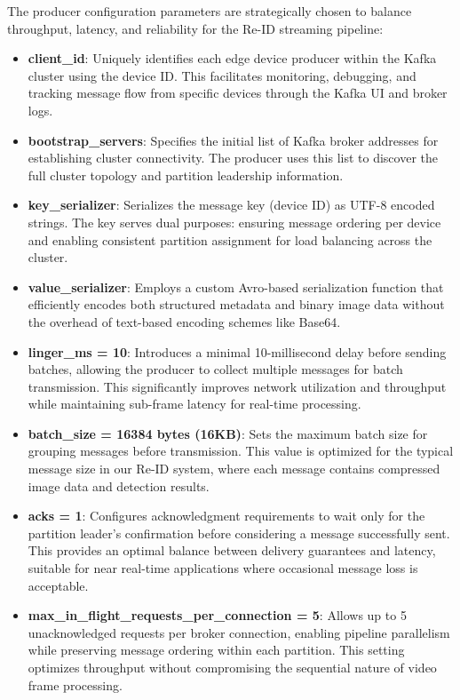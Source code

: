 The producer configuration parameters are strategically chosen to balance throughput, latency, and reliability for the Re-ID streaming pipeline:

\begin{itemize}
    \item \textbf{client\_id}: Uniquely identifies each edge device producer within the Kafka cluster using the device ID. This facilitates monitoring, debugging, and tracking message flow from specific devices through the Kafka UI and broker logs.
    
    \item \textbf{bootstrap\_servers}: Specifies the initial list of Kafka broker addresses for establishing cluster connectivity. The producer uses this list to discover the full cluster topology and partition leadership information.
    
    \item \textbf{key\_serializer}: Serializes the message key (device ID) as UTF-8 encoded strings. The key serves dual purposes: ensuring message ordering per device and enabling consistent partition assignment for load balancing across the cluster.
    
    \item \textbf{value\_serializer}: Employs a custom Avro-based serialization function that efficiently encodes both structured metadata and binary image data without the overhead of text-based encoding schemes like Base64.
    
    \item \textbf{linger\_ms = 10}: Introduces a minimal 10-millisecond delay before sending batches, allowing the producer to collect multiple messages for batch transmission. This significantly improves network utilization and throughput while maintaining sub-frame latency for real-time processing.
    
    \item \textbf{batch\_size = 16384 bytes (16KB)}: Sets the maximum batch size for grouping messages before transmission. This value is optimized for the typical message size in our Re-ID system, where each message contains compressed image data and detection results.
    
    \item \textbf{acks = 1}: Configures acknowledgment requirements to wait only for the partition leader's confirmation before considering a message successfully sent. This provides an optimal balance between delivery guarantees and latency, suitable for near real-time applications where occasional message loss is acceptable.
    
    \item \textbf{max\_in\_flight\_requests\_per\_connection = 5}: Allows up to 5 unacknowledged requests per broker connection, enabling pipeline parallelism while preserving message ordering within each partition. This setting optimizes throughput without compromising the sequential nature of video frame processing.
\end{itemize}

